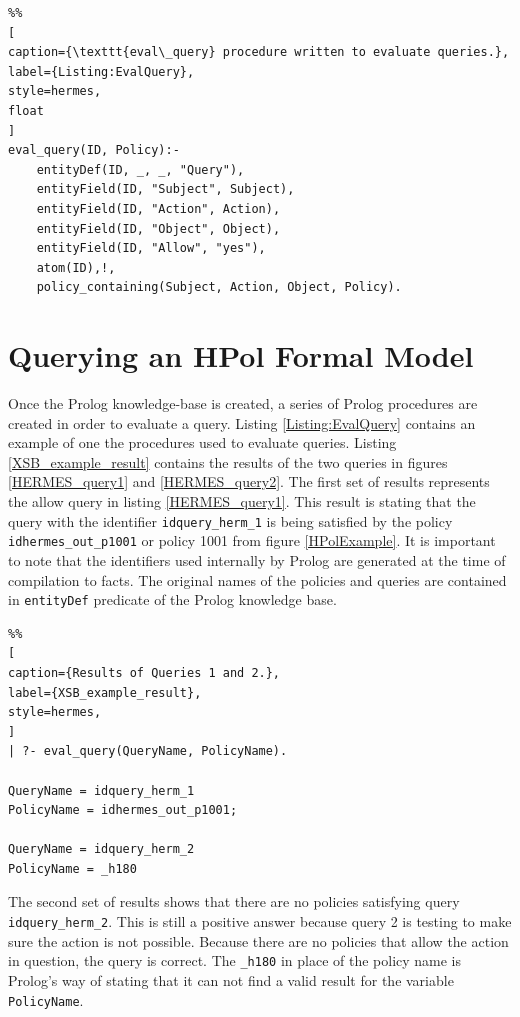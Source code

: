 \documentclass[12pt,letterpaper]{report}
\begin{document}
\begin{lstlisting}%%
[
caption={\texttt{eval\_query} procedure written to evaluate queries.},
label={Listing:EvalQuery},
style=hermes,
float
]
eval_query(ID, Policy):-
	entityDef(ID, _, _, "Query"),
	entityField(ID, "Subject", Subject),
	entityField(ID, "Action", Action),
	entityField(ID, "Object", Object),
	entityField(ID, "Allow", "yes"),
	atom(ID),!,
	policy_containing(Subject, Action, Object, Policy).
\end{lstlisting}

\section{Querying an HPol Formal Model}

Once the Prolog knowledge-base is created, a series of Prolog procedures are created in order to evaluate a query. Listing \ref{Listing:EvalQuery} contains an example of one the procedures used to evaluate queries. Listing \ref{XSB_example_result} contains the results of the two queries in figures \ref{HERMES_query1} and \ref{HERMES_query2}. The first set of results represents the allow query in listing \ref{HERMES_query1}. This result is stating that the query with the identifier \texttt{idquery\_herm\_1} is being satisfied by the policy \texttt{idhermes\_out\_p1001} or policy 1001 from figure \ref{HPolExample}. It is important to note that the identifiers used internally by Prolog are generated at the time of compilation to facts. The original names of the policies and queries are contained in \texttt{entityDef} predicate of the Prolog knowledge base. 

\begin{lstlisting}%%
[
caption={Results of Queries 1 and 2.},
label={XSB_example_result},
style=hermes,
]
| ?- eval_query(QueryName, PolicyName).

QueryName = idquery_herm_1
PolicyName = idhermes_out_p1001;

QueryName = idquery_herm_2
PolicyName = _h180
\end{lstlisting}

The second set of results shows that there are no policies satisfying query \texttt{idquery\_herm\_2}. This is still a positive answer because query 2 is testing to make sure the action is not possible. Because there are no policies that allow the action in question, the query is correct. The \texttt{\_h180} in place of the policy name is Prolog's way of stating that it can not find a valid result for the variable \texttt{PolicyName}.
\end{document}
